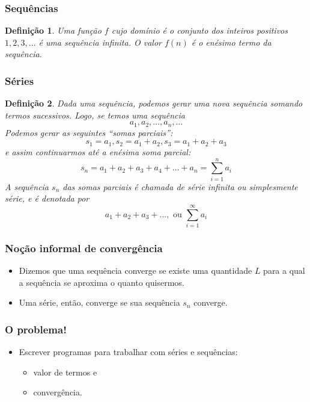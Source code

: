 \documentclass{beamer}
\newtheorem{mydef}{Defini\c c\~ao}
\begin{document}
\begin{frame}[fragile]
  \frametitle{Sequ\^encias}
  \begin{mydef}
    Uma fun\c c\~ao $f$ cujo dom\'inio \'e o conjunto dos inteiros
    positivos $1, 2, 3, \ldots$ \'e uma sequ\^encia infinita. O valor
    $f(n)$ \'e o en\'esimo \emph{termo} da sequ\^encia.
  \end{mydef}
\end{frame}

\begin{frame}[fragile]
  \frametitle{S\'eries}
  \begin{mydef}
\small
    Dada uma sequ\^encia, podemos gerar uma nova sequ\^encia somando
    termos sucessivos. Logo, se temos uma sequ\^encia
    \begin{equation}
      a_1, a_2, \ldots, a_n, \ldots
    \end{equation}
    Podemos gerar as seguintes ``somas parciais'':
    \begin{equation}
      s_1 = a_1, s_2 = a_1 + a_2,  s_3 = a_1 + a_2 + a_3
    \end{equation}
    e assim continuarmos at\'e a en\'esima soma parcial:
    \begin{equation}
      s_n = a_1 + a_2 + a_3 + a_4 + \ldots + a_n = \sum_{i = 1}^{n}a_i
    \end{equation}
    A sequ\^encia ${s_n}$ das somas parciais \'e chamada de
    \emph{s\'erie infinita} ou simplesmente \emph{s\'erie}, e \'e
    denotada por
    \begin{equation}
      a_1 + a_2 + a_3 + \ldots, \textrm{  ou  } \sum_{i = 1}^{\infty}a_i
    \end{equation}
  \end{mydef}
\end{frame}

\normalsize
\begin{frame}[fragile]
  \frametitle{No\c c\~ao informal de converg\^encia}
  \begin{itemize}
  \item Dizemos que uma sequ\^encia converge se existe uma
    quantidade $L$ para a qual a sequ\^encia se aproxima o quanto
    quisermos.
  \item Uma s\'erie, ent\~ao, converge se sua sequ\^encia ${s_n}$
    converge.
  \end{itemize}
\end{frame}

\begin{frame}[fragile]
  \frametitle{O problema!}
  \begin{itemize}
  \item Escrever programas para trabalhar com s\'eries e sequ\^encias:
    \begin{itemize}
    \item valor de termos e
    \item converg\^encia.
    \end{itemize}
  \end{itemize}
\end{frame}
\end{document}
